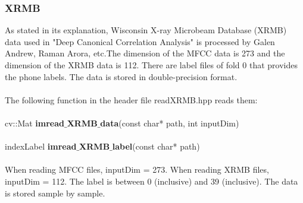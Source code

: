 \documentclass[12pt]{article}
\begin{document}
\subsubsection{XRMB}
As stated in its explanation, Wisconsin X-ray Microbeam Database (XRMB) data used in "Deep Canonical Correlation Analysis" is processed by Galen Andrew, Raman Arora, etc.The dimension of the MFCC data is 273 and the dimension of the XRMB data is 112. There are label files of fold 0 that provides the phone labels. The data is stored in double-precision format.\\
\\
The following function in the header file readXRMB.hpp reads them:\\
\\
cv::Mat \textbf{imread$\_$XRMB$\_$data}(const char* path, int inputDim)\\
\\
indexLabel \textbf{imread$\_$XRMB$\_$label}(const char* path)\\
\\
When reading MFCC files, inputDim = 273. When reading XRMB files, inputDim = 112. The label is between 0 (inclusive) and 39 (inclusive). The data is stored sample by sample. 
\end{document}
